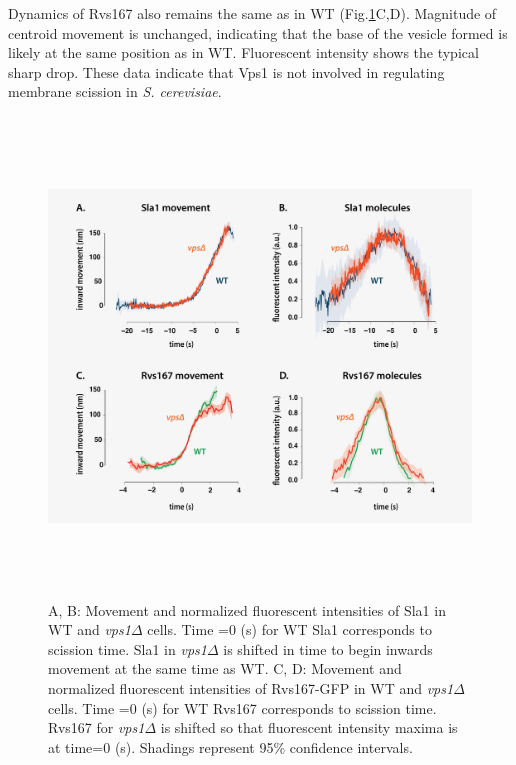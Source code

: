 \vspace{5mm}
Dynamics of Rvs167 also remains the same as in WT (Fig.\ref{fig4_vpsdel2}C,D). Magnitude of centroid movement is unchanged, indicating that the base of the vesicle formed is likely at the same position as in WT. Fluorescent intensity shows the typical sharp drop. These data indicate that Vps1 is not involved in regulating membrane scission in \textit{S. cerevisiae}.  


	\begin{figure}[H]
	\centering
	\includegraphics[width=12.7cm,height=12.7cm,keepaspectratio]{figures/results_final/vps2}
	\caption[Tracking endocytic proteins in \textit{vps1$\Delta$} cells]
	{A, B: Movement and normalized fluorescent intensities of Sla1 in WT and \textit{vps1$\Delta$} cells. Time =0 (s) for WT Sla1 corresponds to scission time. Sla1 in \textit{vps1$\Delta$} is shifted in time to begin inwards movement at the same time as WT. 
		C, D: Movement and normalized fluorescent intensities of Rvs167-GFP in WT and  \textit{vps1$\Delta$} cells. Time =0 (s) for WT Rvs167 corresponds to scission time. Rvs167 for \textit{vps1$\Delta$} is shifted so that fluorescent intensity maxima is at time=0 (s).
		Shadings represent 95\% confidence intervals.
		\label{fig4_vpsdel2}}
\end{figure}



